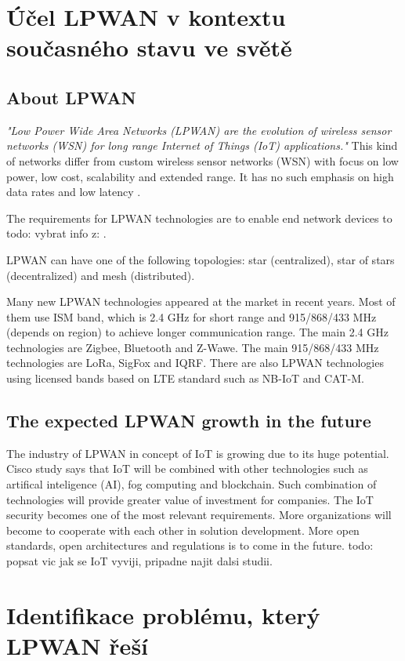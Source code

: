 \chapter{Účel LPWAN v kontextu současného stavu ve světě}

\section{About LPWAN}
\textit{"Low Power Wide Area Networks (LPWAN) are the
evolution of wireless sensor networks (WSN) for long
range Internet of Things (IoT) applications."} \cite{MURS Band for LPWAN Applications}
This kind of networks differ from custom wireless sensor networks (WSN) with focus on low power, low cost, scalability and extended range.
It has no such emphasis on high data rates and low latency \cite{MURS Band for LPWAN Applications}.


The requirements for LPWAN technologies are to enable end network devices to 
todo: vybrat info z: \cite{MURS Band for LPWAN Applications}.





LPWAN can have one of the following topologies: star (centralized), star of stars (decentralized) and mesh (distributed).
\cite{high density LPWAN}

Many new LPWAN technologies appeared at the market in recent years.
Most of them use ISM band, which is 2.4 GHz for short range and 915/868/433 MHz (depends on region) to achieve longer communication range.
The main 2.4 GHz technologies are Zigbee, Bluetooth and Z-Wawe.
The main 915/868/433 MHz technologies are LoRa, SigFox and IQRF.
There are also LPWAN technologies using licensed bands based on LTE standard
such as NB-IoT and CAT-M.
















\section{The expected LPWAN growth in the future}
The industry of LPWAN in concept of IoT is growing due to its huge potential.
Cisco study \cite{IoT cisco study} says that IoT will be combined with other technologies such as artifical inteligence (AI), fog computing and blockchain. Such combination of technologies will provide greater value of investment for companies. 
The IoT security becomes one of the most relevant requirements.
More organizations will become to cooperate with each other in solution development.
More open standards, open architectures and regulations is to come in the future.
todo: popsat vic jak se IoT vyviji, pripadne najit dalsi studii.
















\chapter{Identifikace problému, který LPWAN řeší}